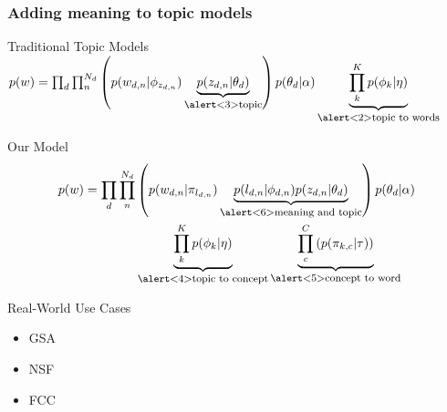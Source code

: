 \documentclass[compress]{beamer}
\newcommand{\explain}[2]{\underbrace{#2}_{\mbox{\footnotesize{#1}}}}
\begin{document}
\begin{frame}
  \frametitle{Adding meaning to topic models}
        \begin{block}{Traditional Topic Models}
                $ p(w) = \prod_d \prod_n^{N_d} \left( p(w_{d,n} | \phi_{z_{d,n}})
                  \explain{\alert<3>{topic}}{p(z_{d,n} | \theta_d)} \right) p(\theta_d | \alpha)                 \explain{\alert<2>{topic to words}}{ \prod_k^K
p(\phi_k | \eta) }$
        \end{block}

        \begin{block}{Our Model}
          \vspace{-0.8cm}
          \begin{align*}
               p(w) = \prod_d \prod_n^{N_d} & \left( p(w_{d,n} | \pi_{l_{d,n}})
                 \explain{\alert<6>{meaning and topic}} {p(l_{d,n} | \phi_{d,n} )
                   p(z_{d,n} | \theta_d)}  \right) p(\theta_d | \alpha) \\
               &  \explain{\alert<4>{topic to concept}}{\prod_k^K
                p(\phi_k | \eta)} \explain{\alert<5>{concept to word}}{\prod_c^C \left(
                  p(\pi_{k,c} | \tau) \right) }
           \end{align*}
        \end{block}


\end{frame}








\begin{frame}{Real-World Use Cases}

  \begin{itemize}
    \item GSA
    \item NSF
    \item FCC
   \end{itemize}

\end{frame}

\begin{frame}[plain]
\vspace*{-1pt}
\end{frame}
\end{document}
